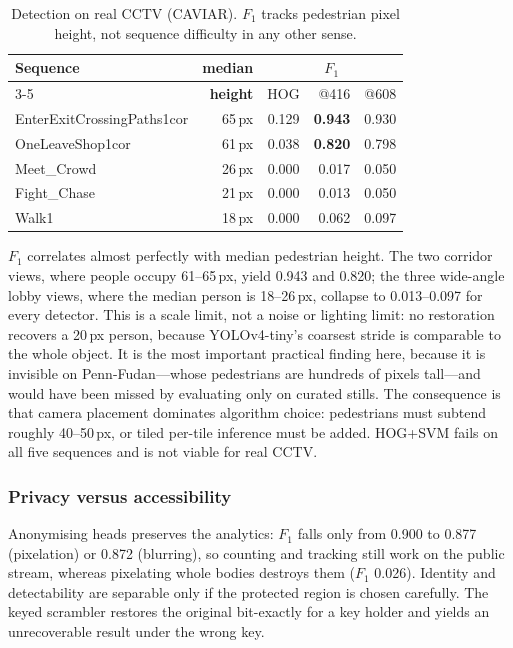 \documentclass[conference,10pt]{IEEEtran}
\newcommand{\hdr}[1]{\textbf{#1}}
\begin{document}
\begin{table}[!t]
\caption{Detection on real CCTV (CAVIAR). $F_1$ tracks pedestrian pixel height,
not sequence difficulty in any other sense.}
\label{tab:caviar}
\centering
\scriptsize
\begin{tabular}{@{}lrrrr@{}}
\toprule
\multirow{2}{*}{\hdr{Sequence}} & \hdr{median} & \multicolumn{3}{c}{\hdr{$F_1$}} \\
\cmidrule(lr){3-5}
 & \hdr{height} & HOG & @416 & @608 \\
\midrule
EnterExitCrossingPaths1cor & 65\,px & 0.129 & \textbf{0.943} & 0.930 \\
OneLeaveShop1cor           & 61\,px & 0.038 & \textbf{0.820} & 0.798 \\
Meet\_Crowd                & 26\,px & 0.000 & 0.017 & 0.050 \\
Fight\_Chase               & 21\,px & 0.000 & 0.013 & 0.050 \\
Walk1                      & 18\,px & 0.000 & 0.062 & 0.097 \\
\bottomrule
\end{tabular}
\end{table}

$F_1$ correlates almost perfectly with median pedestrian height. The two
corridor views, where people occupy 61--65\,px, yield 0.943 and 0.820; the
three wide-angle lobby views, where the median person is 18--26\,px, collapse
to 0.013--0.097 for every detector. This is a scale limit, not a noise or
lighting limit: no restoration recovers a 20\,px person, because YOLOv4-tiny's
coarsest stride is comparable to the whole object. It is the most important
practical finding here, because it is invisible on Penn-Fudan---whose
pedestrians are hundreds of pixels tall---and would have been missed by
evaluating only on curated stills. The consequence is that camera placement
dominates algorithm choice: pedestrians must subtend roughly 40--50\,px, or
tiled per-tile inference must be added. HOG+SVM fails on all five sequences and
is not viable for real CCTV.

\subsubsection{Privacy versus accessibility}
Anonymising heads preserves the analytics: $F_1$ falls only from 0.900 to 0.877
(pixelation) or 0.872 (blurring), so counting and tracking still work on the
public stream, whereas pixelating whole bodies destroys them ($F_1$ 0.026).
Identity and detectability are separable only if the protected region is chosen
carefully. The keyed scrambler restores the original bit-exactly for a key
holder and yields an unrecoverable result under the wrong key.
\end{document}
